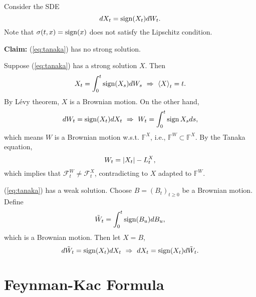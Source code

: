 \begin{exam}
    Consider the SDE
    \begin{equation*}\label{eq:tanaka}
        dX_t = \operatorname{sign}(X_t)dW_t.
    \end{equation*}
    Note that $\sigma(t,x) = \operatorname{sign}(x)$ does not satisfy the Lipschitz condition.

    \noindent \textbf{Claim:} (\ref{eq:tanaka}) has no strong solution.

    \noindent Suppose (\ref{eq:tanaka}) has a strong solution $X$. Then
    \begin{equation*}
        X_t = \int_0^t \operatorname{sign}(X_s)dW_s~\Rightarrow~ \left\langle X \right\rangle_t = t.
    \end{equation*}
    By L\'evy theorem, $X$ is a Brownian motion. On the other hand,
    \begin{equation*}
        dW_t = \operatorname{sign}(X_t)dX_t~\Rightarrow~ W_t = \int_0^t \operatorname{sign}{X_s}ds,
    \end{equation*}
    which means $W$ is a Brownian motion w.s.t. $\mathbb{F}^X$, i.e., $\mathbb{F}^W \subset \mathbb{F}^X$. By the Tanaka equation,
    \begin{equation*}
        W_t = \left\lvert X_t\right\lvert - L^X_t,
    \end{equation*}
    which implies that $\mathcal{F}^W_t \neq \mathcal{F}^X_t$, contradicting to $X$ adapted to $\mathbb{F}^W$.

    \noindent (\ref{eq:tanaka}) has a weak solution. Choose $B = (B_t)_{t \geq 0}$ be a Brownian motion. Define
    \begin{equation*}
        \tilde{W}_t = \int_0^t\operatorname{sign}(B_u)dB_u,
    \end{equation*}
    which is a Brownian motion. Then let $X=B$,
    \begin{equation*}
        d\tilde{W}_t = \operatorname{sign}(X_t)dX_t~\Rightarrow~dX_t = \operatorname{sign}(X_t)d\tilde{W}_t.
    \end{equation*}
\end{exam}

\section{Feynman-Kac Formula}

